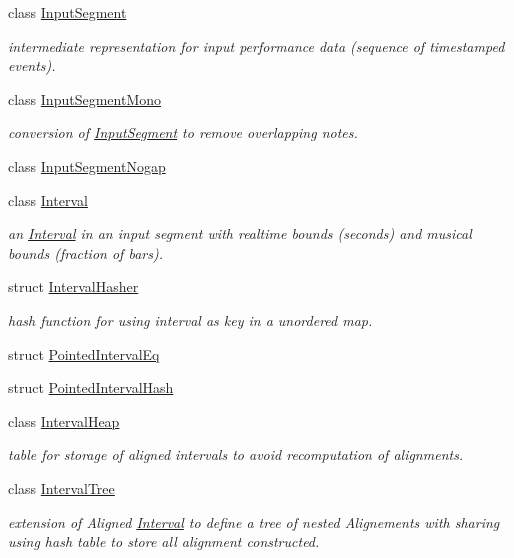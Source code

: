 \begin{DoxyCompactItemize}
class \mbox{\hyperlink{classInputSegment}{Input\+Segment}}
\begin{DoxyCompactList}\small\item\em intermediate representation for input performance data (sequence of timestamped events). \end{DoxyCompactList}\item 
class \mbox{\hyperlink{classInputSegmentMono}{Input\+Segment\+Mono}}
\begin{DoxyCompactList}\small\item\em conversion of \mbox{\hyperlink{classInputSegment}{Input\+Segment}} to remove overlapping notes. \end{DoxyCompactList}\item 
class \mbox{\hyperlink{classInputSegmentNogap}{Input\+Segment\+Nogap}}
\item 
class \mbox{\hyperlink{classInterval}{Interval}}
\begin{DoxyCompactList}\small\item\em an \mbox{\hyperlink{classInterval}{Interval}} in an input segment with realtime bounds (seconds) and musical bounds (fraction of bars). \end{DoxyCompactList}\item 
struct \mbox{\hyperlink{structIntervalHasher}{Interval\+Hasher}}
\begin{DoxyCompactList}\small\item\em hash function for using interval as key in a unordered map. \end{DoxyCompactList}\item 
struct \mbox{\hyperlink{structPointedIntervalEq}{Pointed\+Interval\+Eq}}
\item 
struct \mbox{\hyperlink{structPointedIntervalHash}{Pointed\+Interval\+Hash}}
\item 
class \mbox{\hyperlink{classIntervalHeap}{Interval\+Heap}}
\begin{DoxyCompactList}\small\item\em table for storage of aligned intervals to avoid recomputation of alignments. \end{DoxyCompactList}\item 
class \mbox{\hyperlink{classIntervalTree}{Interval\+Tree}}
\begin{DoxyCompactList}\small\item\em extension of Aligned \mbox{\hyperlink{classInterval}{Interval}} to define a tree of nested Alignements with sharing using hash table to store all alignment constructed. \end{DoxyCompactList}\item 

\end{DoxyCompactItemize}
